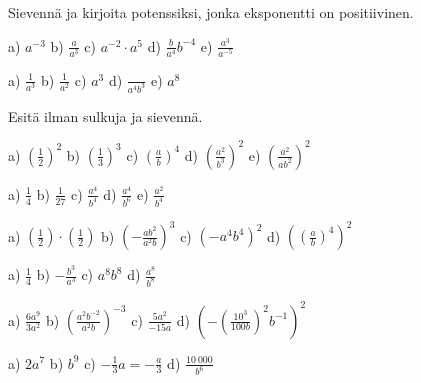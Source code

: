 Sievennä ja kirjoita potenssiksi, jonka eksponentti on positiivinen.
\begin{tehtava}
a) $a^{-3}$ \qquad b) $\frac{a}{a^3}$ \qquad c) $a^{-2}\cdot a^5$ \qquad d) $\frac{b}{a^4}b^{-4}$ \qquad e) $\frac{a^3}{a^{-5}}$
\begin{vastaus}
a) $\frac{1}{a^3}$ \qquad b) $\frac{1}{a^2}$ \qquad c) $a^3$ \qquad d) $\frac{}{a^4b^3}$ \qquad e) $a^8$
\end{vastaus}
\end{tehtava}
Esitä ilman sulkuja ja sievennä.
\begin{tehtava}
a) $(\frac{1}{2})^2$ \qquad b) $(\frac{1}{3})^3$ \qquad c) $(\frac{a}{b})^4$ \qquad d) $(\frac{a^2}{b^3})^2$ \qquad
e) $\left(\frac{a^2}{ab^2}\right)^2$
\begin{vastaus}
a) $\frac{1}{4}$ \qquad b) $\frac{1}{27}$ \qquad c) $\frac{a^4}{b^4}$ \qquad d) $\frac{a^4}{b^6}$ \qquad e) $\frac{a^2}{b^4}$
\end{vastaus}
\end{tehtava}
\begin{tehtava}
a) $(\frac{1}{2})\cdot(\frac{1}{2})$ \qquad b) $(-\frac{ab^2}{a^2b})^3$ \qquad c) $(-a^4b^4)^2$ \qquad d) $\left((\frac{a}{b})^4\right)^2$
\begin{vastaus}
a) $\frac{1}{4}$ \qquad b) $-\frac{b^3}{a^3}$ \qquad c) $a^8b^8$ \qquad d) $\frac{a^8}{b^8}$
\end{vastaus}
\end{tehtava}
\begin{tehtava}
a) $\frac{6a^9}{3a^2}$ \qquad b) $(\frac{a^2b^{-2}}{a^2b})^{-3}$ \qquad c) $\frac{5a^2}{-15a}$ \qquad
d) $\left(-(\frac{10^3}{100b})^2 b^{-1} \right )^2$
\begin{vastaus}
a) $2a^7$ \qquad b) $b^9$ \qquad c) $-\frac{1}{3}a = -\frac{a}{3}$ \qquad d) $\frac{10\ 000}{b^6}$
\end{vastaus}
\end{tehtava}
